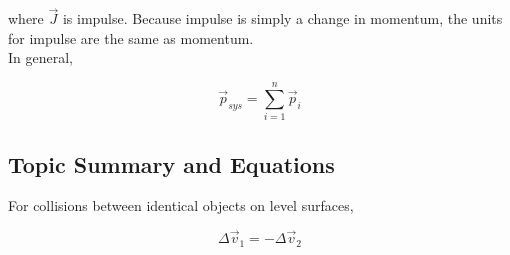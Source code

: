             where $\overrightarrow{J}$ is impulse. Because impulse is simply a change in momentum, the units for impulse are the same as momentum. \\

            In general,

            \[
                \overrightarrow{p}_{sys} = \sum^n_{i=1} \overrightarrow{p}_i
            \]


        \subsection{Topic Summary and Equations}

            For collisions between identical objects on level surfaces,

            \[
                \Delta \overrightarrow{v}_1 = -\Delta \overrightarrow{v}_2
            \]





